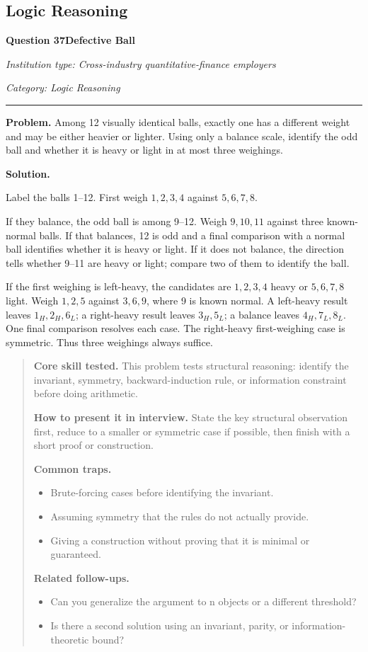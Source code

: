 \documentclass[11pt,letterpaper,openany]{book}
\newenvironment{EditorialNote}
  {\begin{quote}\small\setlength{\parskip}{0.25em}}
  {\end{quote}}
\newcommand{\QuestionSpacer}{\vspace{0.4em}}
\newcommand{\FoundationQuestionHeader}[3]{%
  \vspace{1.0em}%
  {\large\bfseries #1\enspace #2\par}%
  {\small\itshape Institution type: Cross-industry quantitative-finance employers\par}%
  {\small\itshape Category: #3\par}%
  \vspace{0.25em}\hrule\vspace{0.45em}%
}
\begin{document}
\subsection{Logic Reasoning}

\FoundationQuestionHeader{Question 37}{Defective Ball}{Logic Reasoning}

\textbf{Problem.} Among 12 visually identical balls, exactly one has a different weight and may be either heavier or lighter. Using only a balance scale, identify the odd ball and whether it is heavy or light in at most three weighings.


\textbf{Solution.}

Label the balls 1--12. First weigh \(1,2,3,4\) against \(5,6,7,8\).

If they balance, the odd ball is among 9--12. Weigh \(9,10,11\) against three known-normal balls. If that balances, 12 is odd and a final comparison with a normal ball identifies whether it is heavy or light. If it does not balance, the direction tells whether 9--11 are heavy or light; compare two of them to identify the ball.

If the first weighing is left-heavy, the candidates are \(1,2,3,4\) heavy or \(5,6,7,8\) light. Weigh \(1,2,5\) against \(3,6,9\), where 9 is known normal. A left-heavy result leaves \(1_H,2_H,6_L\); a right-heavy result leaves \(3_H,5_L\); a balance leaves \(4_H,7_L,8_L\). One final comparison resolves each case. The right-heavy first-weighing case is symmetric. Thus three weighings always suffice.


\begin{EditorialNote}


\textbf{Core skill tested.} This problem tests structural reasoning: identify the invariant, symmetry, backward-induction rule, or information constraint before doing arithmetic.


\textbf{How to present it in interview.} State the key structural observation first, reduce to a smaller or symmetric case if possible, then finish with a short proof or construction.


\textbf{Common traps.}
\begin{itemize}
\item Brute-forcing cases before identifying the invariant.
\item Assuming symmetry that the rules do not actually provide.
\item Giving a construction without proving that it is minimal or guaranteed.
\end{itemize}


\textbf{Related follow-ups.}
\begin{itemize}
\item Can you generalize the argument to n objects or a different threshold?
\item Is there a second solution using an invariant, parity, or information-theoretic bound?
\end{itemize}


\end{EditorialNote}
\QuestionSpacer
\end{document}
